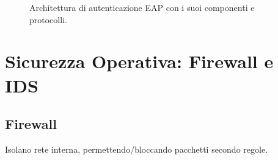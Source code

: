 \begin{figure}[H]
    \caption{Architettura di autenticazione EAP con i suoi componenti e protocolli.}
\end{figure}

\section{Sicurezza Operativa: Firewall e IDS}
\label{sec:firewall_ids}

\subsection{Firewall}
Isolano rete interna, permettendo/bloccando pacchetti secondo regole.

